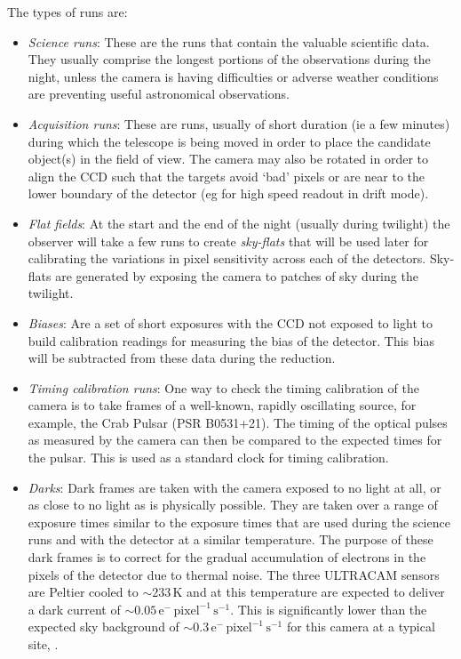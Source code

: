 The types of runs are: 
\begin{itemize}
	\item \emph{Science runs}: These are the runs that contain the valuable scientific data. They usually comprise the longest portions of the observations during the night, unless the camera is having difficulties or adverse weather conditions are preventing useful astronomical observations.
	\item \emph{Acquisition runs}: These are runs, usually of short duration (ie a few minutes) during which the telescope is being moved in order to place the candidate object(s) in the field of view. The camera may also be rotated in order to align the CCD such that the targets avoid `bad' pixels or are near to the lower boundary of the detector (eg for high speed readout in drift mode). 
	\item \emph{Flat fields}: At the start and the end of the night (usually during twilight) the observer will take a few runs to create \emph{sky-flats} that will be used later for calibrating the variations in pixel sensitivity across each of the detectors.  Sky-flats are generated by exposing the camera to patches of sky during the twilight. 
	\item \emph{Biases}: Are a set of short exposures with the CCD not exposed to light to build calibration readings for measuring the bias of the detector. This bias will be subtracted from these data during the reduction. 
	\item \emph{Timing calibration runs}: One way to check the timing calibration of the camera is to take frames of a well-known, rapidly oscillating source, for example, the Crab Pulsar (PSR B0531+21). The timing of the optical pulses as measured by the camera can then be compared to the expected times for the pulsar. This is used as a standard clock for timing calibration.
	\item \emph{Darks}: Dark frames are taken with the camera exposed to no light at all, or as close to no light as is physically possible. They are taken over a range of exposure times similar to the exposure times that are used during the science runs and with the detector at a similar temperature. The purpose of these dark frames is to correct for the gradual accumulation of electrons in the pixels of the detector due to thermal noise. The three ULTRACAM sensors are Peltier cooled to $\sim 233\,\mbox{K}$ and at this temperature are expected to deliver a dark current of $\sim0.05\,\mbox{e}^{-}\,\mbox{pixel}^{-1}\,\mbox{s}^{-1}$. This is significantly lower than the expected sky background of $\sim0.3\,\mbox{e}^{-}\,\mbox{pixel}^{-1}\,\mbox{s}^{-1}$ for this camera at a typical site, \citep{dhillon07}. 
\end{itemize}

